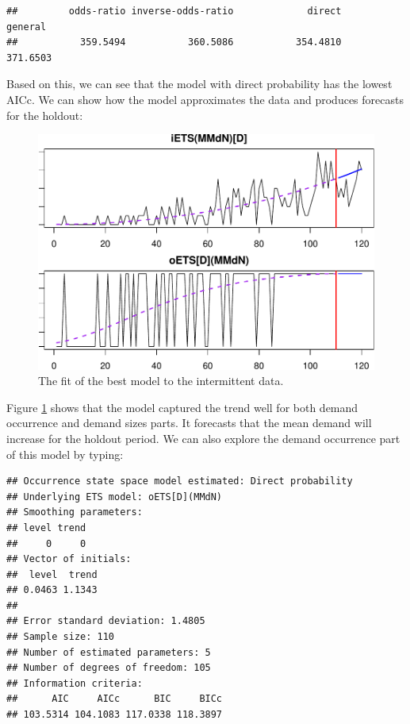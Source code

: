 \documentclass[]{book}
\newenvironment{Shaded}{\begin{snugshade}}{\end{snugshade}}
\newcommand{\NormalTok}[1]{#1}
\newcommand{\OperatorTok}[1]{\textcolor[rgb]{0.81,0.36,0.00}{\textbf{#1}}}
\theoremstyle{definition}
\theoremstyle{definition}
\theoremstyle{definition}
\theoremstyle{definition}
\theoremstyle{remark}
\begin{document}
\begin{verbatim}
##         odds-ratio inverse-odds-ratio             direct            general 
##           359.5494           360.5086           354.4810           371.6503
\end{verbatim}

Based on this, we can see that the model with direct probability has the lowest AICc. We can show how the model approximates the data and produces forecasts for the holdout:

\begin{figure}
\centering
\includegraphics{Svetunkov--2022----ADAM_files/figure-latex/adamModelsiETSBest-1.pdf}
\caption{\label{fig:adamModelsiETSBest}The fit of the best model to the intermittent data.}
\end{figure}

Figure \ref{fig:adamModelsiETSBest} shows that the model captured the trend well for both demand occurrence and demand sizes parts. It forecasts that the mean demand will increase for the holdout period. We can also explore the demand occurrence part of this model by typing:

\begin{Shaded}
\end{Shaded}

\begin{verbatim}
## Occurrence state space model estimated: Direct probability
## Underlying ETS model: oETS[D](MMdN)
## Smoothing parameters:
## level trend 
##     0     0 
## Vector of initials:
##  level  trend 
## 0.0463 1.1343 
## 
## Error standard deviation: 1.4805
## Sample size: 110
## Number of estimated parameters: 5
## Number of degrees of freedom: 105
## Information criteria: 
##      AIC     AICc      BIC     BICc 
## 103.5314 104.1083 117.0338 118.3897
\end{verbatim}
\end{document}
